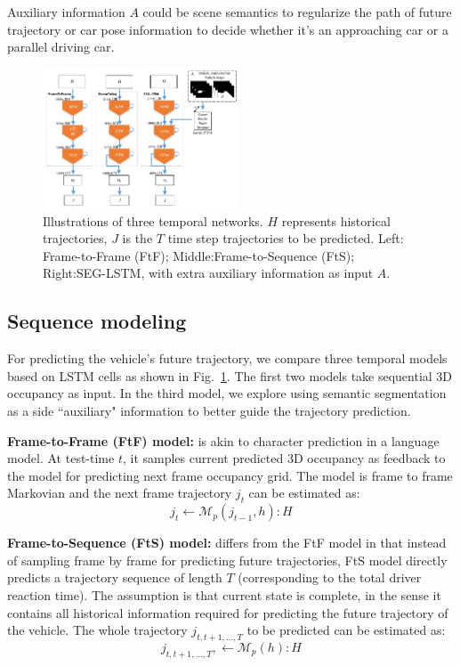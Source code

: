 \documentclass[10pt,twocolumn,letterpaper]{article}
\begin{document}
Auxiliary information $A$ could be scene semantics to regularize the path of future trajectory or car pose information to decide whether it's an approaching car or a parallel driving car.


\begin{figure}[t]
        \centering
        \includegraphics[width=0.52\textwidth]{figures/network_detail.pdf}
        \caption{Illustrations of three temporal networks. $H$ represents historical trajectories, $J$ is the $T$ time step trajectories to be predicted.  Left: Frame-to-Frame (FtF); Middle:Frame-to-Sequence (FtS); Right:SEG-LSTM, with extra auxiliary information as input $A$.}
        \label{fig:lstm}
\end{figure}

\subsection{Sequence modeling}

For predicting the vehicle's future trajectory, we compare three temporal models based on LSTM cells  as shown in Fig.~\ref{fig:lstm}. The first two models take sequential 3D occupancy as input. In the third model, we  explore using semantic segmentation as a side ``auxiliary" information to better guide the trajectory prediction.

\vspace{\baselineskip}
\noindent \textbf{Frame-to-Frame (FtF) model:}
is akin to character prediction in a language model.  At test-time $t$, it samples current predicted 3D occupancy as feedback to the model for predicting next frame occupancy grid. The model is frame to frame Markovian and the next frame trajectory $j_t$ can be estimated as:
\begin{equation}
j_t \leftarrow  \bm{\mathcal{M}}_p(j_{t-1}, h): H
\label{eq:FtF}
\end{equation}

\vspace{\baselineskip}
\noindent \textbf{Frame-to-Sequence (FtS) model:}
differs from the FtF model in that instead of sampling frame by frame for predicting future trajectories,   FtS model directly predicts a trajectory sequence of length $T$ (corresponding to the total driver reaction time). The assumption is that current state is complete, in the sense it contains all historical information required for predicting the future trajectory of the vehicle. The whole trajectory  $j_{t, t+1, \ldots, T}$ to be predicted can be estimated as:
\begin{equation}
j_{t, t+1, \ldots, T}, \leftarrow  \bm{\mathcal{M}}_p( h): H
\label{eq:FtS}
\end{equation}
\end{document}
